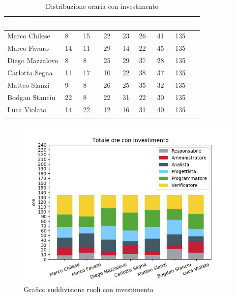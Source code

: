 \begin{longtable}{|C{.30\textwidth}|C{.06\textwidth}|C{.06\textwidth}|C{.06\textwidth} | C{.06\textwidth}| C{.06\textwidth} | C{.06\textwidth} | C{.10\textwidth} |}
\hline
{}	\textbf{\textcolor{white}{Nome}} & \textbf{\textcolor{white}{RE}} & \textbf{\textcolor{white}{AM}} & \textbf{\textcolor{white}{AN}} & \textbf{\textcolor{white}{PJ}} & \textbf{\textcolor{white}{PR}} & \textbf{\textcolor{white}{VE}} & \textbf{\textcolor{white}{Totale}}\\
\hline 
Marco Chilese & 8 & 15 & 22 & 23 & 26 & 41 & 135\\
\hline
{}Marco Favaro & 14 & 11 & 29 & 14 & 22 & 45 & 135\\
\hline
Diego Mazzalovo & 8 & 8 & 25 & 29 & 37 & 28 & 135\\
\hline
{}Carlotta Segna & 11 & 17 & 10 & 22 & 38 & 37 & 135\\
\hline
Matteo Slanzi & 9 & 8 & 26 & 25 & 35 & 32 & 135\\
\hline
{}Bodgan Stanciu & 22 & 8 & 22 & 31 & 22 & 30 & 135\\
\hline
Luca Violato & 14 & 22 & 12 & 16 & 31 & 40 & 135 \\
\hline


\caption{Distribuzione oraria con investimento}
\label{Distribuzione oraria delle ore con investimento}
\end{longtable}

\begin{figure}[H]
	\centering
  		\includegraphics[width=1\linewidth]{./images/fig_toi.png}
  		\caption{Grafico suddivisione ruoli con investimento}
  		\label{fig:grafico suddivione ruoli con investimento}
\end{figure}


